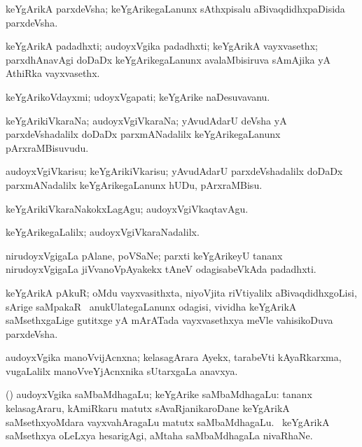 \bentry
{}
\gl{\nA}
\bmng
keYgArikA parxdeVsha; keYgArikegaLanunx sAthxpisalu aBivaqdidhxpaDisida parxdeVsha. 
\emng
\eentry

\bentry
{}
\gl{\nA}
\bmng
keYgArikA padadhxti; audoyxVgika padadhxti; keYgArikA vayxvasethx; parxdhAnavAgi doDaDx keYgArikegaLanunx avalaMbisiruva sAmAjika yA AthiRka vayxvasethx. 
\emng
\eentry

\bentry
{}
\gl{\nA}
\bmng
keYgArikoVdayxmi; udoyxVgapati; keYgArike naDesuvavanu. 
\emng
\eentry

\bentry
{}
\gl{\nA}
\bmng
keYgArikiVkaraNa; audoyxVgiVkaraNa; yAvudAdarU deVsha yA parxdeVshadalilx doDaDx parxmANadalilx keYgArikegaLanunx pArxraMBisuvudu. 
\emng
\eentry

\bentry
{}
\gl{\sakirx}
\bmng
audoyxVgiVkarisu; keYgArikiVkarisu; yAvudAdarU parxdeVshadalilx doDaDx parxmANadalilx keYgArikegaLanunx hUDu, pArxraMBisu. 
\emng

\noindent
\gl{\akirx}
\bmng
keYgArikiVkaraNakokxLagAgu; audoyxVgiVkaqtavAgu. 
\emng
\eentry

\bentry
{}
\gl{\kirxvi}
\bmng
keYgArikegaLalilx; audoyxVgiVkaraNadalilx. 
\emng
\eentry

\bentry
{}
\gl{\nA}
\bmng
nirudoyxVgigaLa pAlane, poVSaNe; parxti keYgArikeyU tananx nirudoyxVgigaLa jiVvanoVpAyakekx tAneV odagisabeVkAda padadhxti. 
\emng
\eentry

\bentry
{}
\gl{\nA}
\bmng
keYgArikA pAkuR; oMdu vayxvasithxta, niyoVjita riVtiyalilx aBivaqdidhxgoLisi, sArige saMpakaR \mo\ anukUlategaLanunx odagisi, vividha keYgArikA saMsethxgaLige gutitxge yA mArATada vayxvasethxya meVle vahisikoDuva parxdeVsha. 
\emng
\eentry

\bentry
{}
\gl{\nA}
\bmng
audoyxVgika manoVvijAcnxna; kelasagArara Ayekx, tarabeVti kAyaRkarxma, \mo vugaLalilx manoVveYjAcnxnika sUtarxgaLa anavxya. 
\emng
\eentry

\bentry
{}
\gl{\nA}
\bmng
(\bava) audoyxVgika saMbaMdhagaLu; keYgArike saMbaMdhagaLu: 
\banum
{} tananx kelasagAraru, kAmiRkaru matutx sAvaRjanikaroDane keYgArikA saMsethxyoMdara vayxvahAragaLu matutx saMbaMdhagaLu. 
 \kanmu\ keYgArikA saMsethxya oLeLxya hesarigAgi, aMtaha saMbaMdhagaLa nivaRhaNe. 
\eanum
\emng
\eentry

